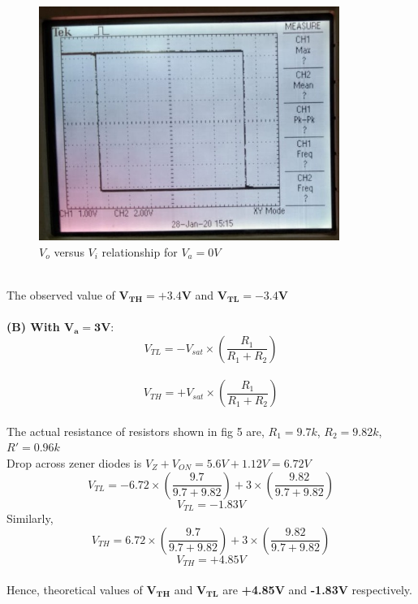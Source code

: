 \documentclass[12pt]{article}
\begin{document}
        \begin{figure}[H]
            \centering
            \includegraphics[width = 0.8\linewidth, height = 3in]{reports/lab2/scmidtt.jpeg}
            \caption{$V_o$ versus $V_i$ relationship for $V_a = 0V$}
        \end{figure}
        \\
        The observed value of $\mathbf{V_{TH} = +3.4V}$ and $\mathbf{V_{TL} = -3.4V}$\\
        \\
        \textbf{(B) With $\mathbf{V_{a} = 3V :}$}\\
         
        \begin{equation}
            V_{TL} = -V_{sat} \times (\frac{R_1}{R_1 + R_2}) 
        \end{equation}
        \\
        \begin{equation}
            V_{TH} = +V_{sat} \times (\frac{R_1}{R_1 + R_2}) 
        \end{equation}
        \\
        The actual resistance of resistors shown in fig 5 are,
        $R_1 = 9.7k$, $R_2 = 9.82k$, $R' = 0.96k$
        \\
        Drop across zener diodes is $V_{Z} + V_{ON} = 5.6V + 1.12V = 6.72V$\\
        \begin{equation}
            V_{TL} = -6.72 \times (\frac{9.7}{9.7 + 9.82}) + 3 \times (\frac{9.82}{9.7 + 9.82})
        \end{equation}
        \begin{equation}
            \boxed{V_{TL} = -1.83V}
        \end{equation}
        Similarly,
        \begin{equation}
            V_{TH} = 6.72 \times (\frac{9.7}{9.7 + 9.82}) + 3 \times (\frac{9.82}{9.7 + 9.82})
        \end{equation}
        \begin{equation}
            \boxed{V_{TH} = +4.85V}
        \end{equation}
        \\
        Hence, theoretical values of $\mathbf{V_{TH}}$ and $\mathbf{V_{TL}}$ are \textbf{+4.85V} and \textbf{-1.83V}   respectively.
        \\
        
\end{document}
